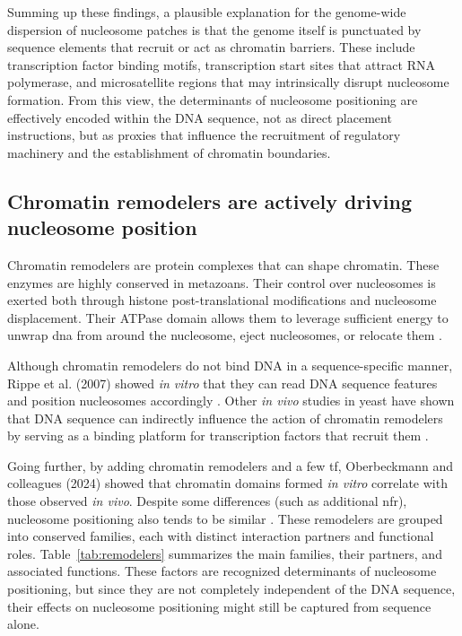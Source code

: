 \documentclass[11pt]{book}
\begin{document}
Summing up these findings, a plausible explanation for the genome-wide dispersion of nucleosome patches is that the genome itself is punctuated by sequence elements that recruit or act as chromatin barriers. These include transcription factor binding motifs, transcription start sites that attract RNA polymerase, and microsatellite regions that may intrinsically disrupt nucleosome formation. From this view, the determinants of nucleosome positioning are effectively encoded within the DNA sequence, not as direct placement instructions, but as proxies that influence the recruitment of regulatory machinery and the establishment of chromatin boundaries. 

\subsection{Chromatin remodelers are actively driving nucleosome position}

Chromatin remodelers are protein complexes that can shape chromatin. These enzymes are highly conserved in metazoans. Their control over nucleosomes is exerted both through histone post-translational modifications and nucleosome displacement. Their ATPase domain allows them to leverage sufficient energy to unwrap \gls{dna} from around the nucleosome, eject nucleosomes, or relocate them \cite{tyagi_chromatin_2016}. 

Although chromatin remodelers do not bind DNA in a sequence-specific manner, Rippe et al. (2007) showed \textit{in vitro} that they can read DNA sequence features and position nucleosomes accordingly \cite{rippe_dna_2007}. Other \textit{in vivo} studies in yeast have shown that DNA sequence can indirectly influence the action of chromatin remodelers by serving as a binding platform for transcription factors that recruit them \cite{badis_library_2008,mcknight_sequence-targeted_2016}. 

Going further, by adding chromatin remodelers and a few \gls{tf}, Oberbeckmann and colleagues (2024) showed that chromatin domains formed \textit{in vitro} correlate with those observed \textit{in vivo}. Despite some differences (such as additional \gls{nfr}), nucleosome positioning also tends to be similar \cite{oberbeckmann_vitro_2024}. These remodelers are grouped into conserved families, each with distinct interaction partners and functional roles. Table~\ref{tab:remodelers} summarizes the main families, their partners, and associated functions. These factors are recognized determinants of nucleosome positioning, but since they are not completely independent of the DNA sequence, their effects on nucleosome positioning might still be captured from sequence alone.
\end{document}
